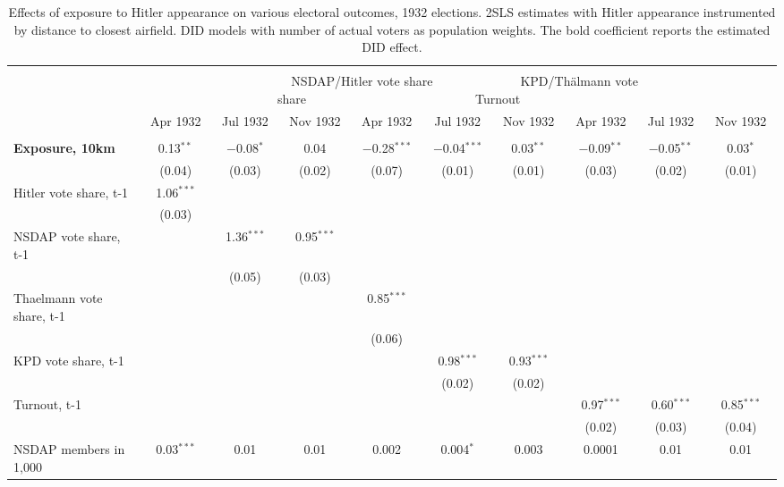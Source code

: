 
\begin{table}[!htbp] \centering 
  \caption{Effects of exposure to Hitler appearance on various electoral outcomes, 1932 elections. 2SLS estimates with Hitler appearance instrumented by distance to closest airfield. DID models with number of actual voters as population weights. The bold coefficient reports the estimated DID effect.} 
  \label{tab:voteshare-iv-2stage} 
\footnotesize 
\begin{tabular}{@{\extracolsep{1pt}}lccccccccc} 
\\[-1.8ex]\hline 
\hline \\[-1.8ex] 
 & \multicolumn{9}{c}{~~NSDAP/Hitler vote share~~~~~~~~~~~~~~KPD/Thälmann vote share~~~~~~~~~~~~~~~~~~~~~~~~~~~Turnout~~~~~~~~~~~~~~~~~~~} \\ 
\cline{2-10} 
 & Apr 1932 & Jul 1932 & Nov 1932 & Apr 1932 & Jul 1932 & Nov 1932 & Apr 1932 & Jul 1932 & Nov 1932 \\ 
\hline \\[-1.8ex] 
 \textbf{Exposure, 10km} & 0.13$^{**}$ & $-$0.08$^{*}$ & 0.04 & $-$0.28$^{***}$ & $-$0.04$^{***}$ & 0.03$^{**}$ & $-$0.09$^{**}$ & $-$0.05$^{**}$ & 0.03$^{*}$ \\ 
  & (0.04) & (0.03) & (0.02) & (0.07) & (0.01) & (0.01) & (0.03) & (0.02) & (0.01) \\ 
  Hitler vote share, t-1 & 1.06$^{***}$ &  &  &  &  &  &  &  &  \\ 
  & (0.03) &  &  &  &  &  &  &  &  \\ 
  NSDAP vote share, t-1 &  & 1.36$^{***}$ & 0.95$^{***}$ &  &  &  &  &  &  \\ 
  &  & (0.05) & (0.03) &  &  &  &  &  &  \\ 
  Thaelmann vote share, t-1 &  &  &  & 0.85$^{***}$ &  &  &  &  &  \\ 
  &  &  &  & (0.06) &  &  &  &  &  \\ 
  KPD vote share, t-1 &  &  &  &  & 0.98$^{***}$ & 0.93$^{***}$ &  &  &  \\ 
  &  &  &  &  & (0.02) & (0.02) &  &  &  \\ 
  Turnout, t-1 &  &  &  &  &  &  & 0.97$^{***}$ & 0.60$^{***}$ & 0.85$^{***}$ \\ 
  &  &  &  &  &  &  & (0.02) & (0.03) & (0.04) \\ 
  NSDAP members in 1,000 & 0.03$^{***}$ & 0.01 & 0.01 & 0.002 & 0.004$^{*}$ & 0.003 & 0.0001 & 0.01 & 0.01 \\ 

\end{tabular}
\end{table}
